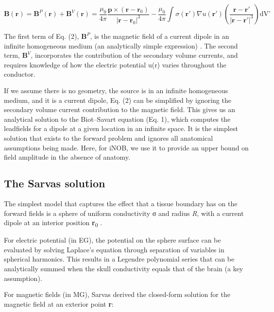\documentclass[11pt]{article}
\begin{document}
\begin{equation}
\mathbf{B}\left( \mathbf{r} \right) = \mathbf{B}^{P}\left( \mathbf{r} \right) + \mathbf{B}^{V}\left( \mathbf{r} \right) = \frac{\mu_{0}}{4\pi}\frac{\mathbf{p} \times \left( \mathbf{r} - \mathbf{r}_{0} \right)}{\left| \mathbf{r} - \mathbf{r}_{0} \right|^{3}} - \frac{\mu_{0}}{4\pi}\int_{}^{}{\sigma\left( \mathbf{r}' \right)\nabla u\left( \mathbf{r}' \right)\left( \frac{\mathbf{r} - \mathbf{r}'}{\left| \mathbf{r} - \mathbf{r}' \right|^{3}} \right)\text{dV'}}
\tag{2}
\end{equation}

The first term of Eq. (2), \(\mathbf{B}^{P}\), is the magnetic
field of a current dipole in an infinite homogeneous medium (an
analytically simple expression) \citep{195}. The second term,
\(\mathbf{B}^{V}\), incorporates the contribution of the
secondary volume currents, and requires knowledge of how the electric
potential u(r) varies throughout the conductor.

If we assume there is no geometry, the source is in an infinite
homogeneous medium, and it is a current dipole, Eq. (2) can be
simplified by ignoring the secondary volume current contribution to the
magnetic field. This gives us an analytical solution to the Biot--Savart
equation (Eq. 1), which computes the leadfields for a dipole at a given
location in an infinite space. It is the simplest solution that exists
to the forward problem and ignores all anatomical assumptions being
made. Here, for iNOB, we use it to provide an upper bound on field
amplitude in the absence of anatomy.

\subsection{The Sarvas solution}\label{the-sarvas-solution}

The simplest model that captures the effect that a tissue boundary has
on the forward fields is a sphere of uniform conductivity σ and radius
\emph{R}, with a current dipole at an interior position
\textbf{r}\textsubscript{0} \citep{195, 196}.

For electric potential (in EG), the potential on the sphere surface can
be evaluated by solving Laplace's equation through
separation of variables in spherical harmonics. This results in a
Legendre polynomial series that can be analytically summed when the
skull conductivity equals that of the brain (a key assumption).

For magnetic fields (in MG), Sarvas derived the closed-form solution for
the magnetic field at an exterior point \textbf{r}:
\end{document}
